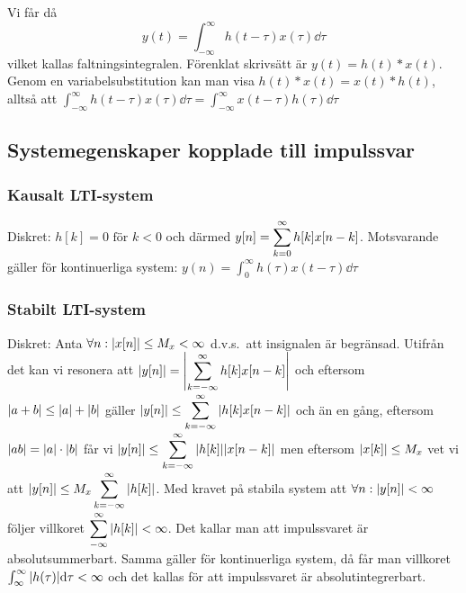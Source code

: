 \documentclass[a4paper]{article}
\begin{document}
Vi får då \[
    y(t) = \int_{-\infty}^{\infty} h(t-\tau)x(\tau)\dd \tau
\] vilket kallas faltningsintegralen. Förenklat skrivsätt är \(
    y(t) = h(t) * x(t)
\). Genom en variabelsubstitution kan man visa \(
    h(t) * x(t) = x(t) * h(t)
\), alltså att \(
    \int_{-\infty}^{\infty} h(t-\tau)x(\tau)\dd \tau = \int_{-\infty}^{\infty} x(t-\tau)h(\tau)\dd \tau
\) 


\subsection{Systemegenskaper kopplade till impulssvar}
\subsubsection{Kausalt LTI-system}
Diskret: \(
    h[k] = 0 \text{ för } k < 0
\) och därmed \(
    y[n] = \displaystyle\sum_{k = 0}^{\infty} h[k]x[n-k]
\). Motsvarande gäller för kontinuerliga system: \(
    y(n) = \int_0^\infty h(\tau)x(t-\tau) \dd \tau
\) 

\subsubsection{Stabilt LTI-system}
Diskret: Anta \(
    \forall n: \abs{x[n]} \leq M_x < \infty
\) d.v.s.\ att insignalen är begränsad. Utifrån det kan vi resonera att \(
    \abs{y[n]} = \abs{\displaystyle\sum_{k = -\infty}^{\infty} h[k]x[n-k]}
\) och eftersom \(
    \abs{a+b} \leq \abs{a} + \abs{b}
\) gäller \(
    \abs{y[n]} \leq \displaystyle\sum_{k = -\infty}^{\infty} \abs{h[k]x[n-k]}
\) och än en gång, eftersom \(
    \abs{ab} = \abs{a}\cdot\abs{b}
\) får vi \(
    \abs{y[n]} \leq \displaystyle\sum_{k = -\infty}^{\infty} \abs{h[k]}\abs{x[n-k]}
\) men eftersom \(
    \abs{x[k]} \leq M_x
\) vet vi att \(
    \abs{y[n]} \leq M_x \displaystyle\sum_{k = -\infty}^{\infty} \abs{h[k]}
\). Med kravet på stabila system att \(
    \forall n: \abs{y[n]} < \infty 
\) följer villkoret \(
    \displaystyle\sum_{-\infty}^{\infty} \abs{h[k]} < \infty
\). Det kallar man att impulssvaret är absolutsummerbart. 
Samma gäller för kontinuerliga system, då får man villkoret \(
    \int_{\infty}^\infty \abs{h(\tau)}\dd \tau < \infty
\) och det kallas för att impulssvaret är absolutintegrerbart.
\end{document}
